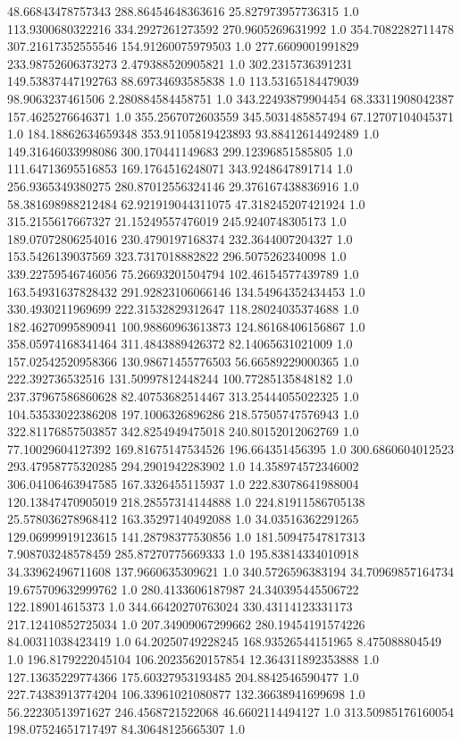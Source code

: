 48.66843478757343	288.86454648363616	25.827973957736315	1.0
113.9300680322216	334.2927261273592	270.9605269631992	1.0
354.7082282711478	307.21617352555546	154.91260075979503	1.0
277.6609001991829	233.98752606373273	2.479388520905821	1.0
302.2315736391231	149.53837447192763	88.69734693585838	1.0
113.53165184479039	98.9063237461506	2.280884584458751	1.0
343.22493879904454	68.33311908042387	157.4625276646371	1.0
355.2567072603559	345.5031485857494	67.12707104045371	1.0
184.18862634659348	353.91105819423893	93.88412614492489	1.0
149.31646033998086	300.170441149683	299.12396851585805	1.0
111.64713695516853	169.1764516248071	343.9248647891714	1.0
256.9365349380275	280.87012556324146	29.376167438836916	1.0
58.381698988212484	62.921919044311075	47.318245207421924	1.0
315.2155617667327	21.15249557476019	245.9240748305173	1.0
189.07072806254016	230.4790197168374	232.3644007204327	1.0
153.5426139037569	323.7317018882822	296.5075262340098	1.0
339.22759546746056	75.26693201504794	102.46154577439789	1.0
163.54931637828432	291.92823106066146	134.54964352434453	1.0
330.4930211969699	222.31532829312647	118.28024035374688	1.0
182.46270995890941	100.98860963613873	124.86168406156867	1.0
358.05974168341464	311.4843889426372	82.14065631021009	1.0
157.02542520958366	130.98671455776503	56.66589229000365	1.0
222.392736532516	131.50997812448244	100.77285135848182	1.0
237.37967586860628	82.40753682514467	313.25444055022325	1.0
104.53533022386208	197.1006326896286	218.57505747576943	1.0
322.81176857503857	342.8254949475018	240.80152012062769	1.0
77.10029604127392	169.81675147534526	196.664351456395	1.0
300.6860604012523	293.47958775320285	294.2901942283902	1.0
14.358974572346002	306.04106463947585	167.3326455115937	1.0
222.83078641988004	120.13847470905019	218.28557314144888	1.0
224.81911586705138	25.578036278968412	163.35297140492088	1.0
34.03516362291265	129.06999919123615	141.28798377530856	1.0
181.50947547817313	7.908703248578459	285.87270775669333	1.0
195.83814334010918	34.33962496711608	137.9660635309621	1.0
340.5726596383194	34.70969857164734	19.675709632999762	1.0
280.4133606187987	24.340395445506722	122.189014615373	1.0
344.66420270763024	330.43114123331173	217.12410852725034	1.0
207.34909067299662	280.19454191574226	84.00311038423419	1.0
64.20250749228245	168.93526544151965	8.475088804549	1.0
196.8179222045104	106.20235620157854	12.364311892353888	1.0
127.13635229774366	175.60327953193485	204.8842546590477	1.0
227.74383913774204	106.33961021080877	132.36638941699698	1.0
56.22230513971627	246.4568721522068	46.6602114494127	1.0
313.50985176160054	198.07524651717497	84.30648125665307	1.0
